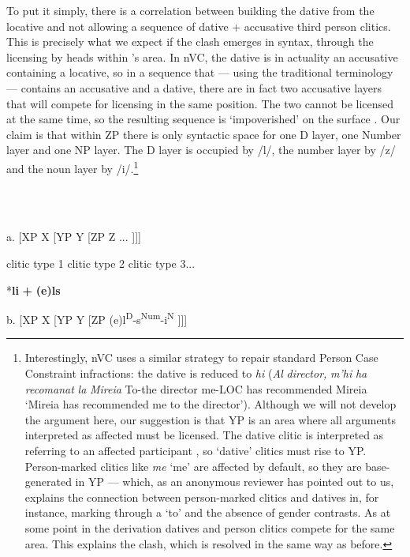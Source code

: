 \documentclass[output=paper,colorlinks,citecolor=brown]{./langscibook}
\begin{document}
To put it simply, there is a correlation between building the dative from the locative and not allowing a sequence of dative + accusative third person clitics. This is precisely what we expect if the clash emerges in syntax, through the licensing by heads within \citeauthor{Sportiche1996}’s area. In nVC, the dative is in actuality an accusative containing a locative, so in a sequence that — using the traditional terminology — contains an accusative and a dative, there are in fact two accusative layers that will compete for licensing in the same position. The two cannot be licensed at the same time, so the resulting sequence is ‘impoverished’ on the surface . Our claim is that within ZP there is only syntactic space for one D layer, one Number layer and one NP layer. The D layer is occupied by /l/, the number layer by /z/ and the noun layer by /i/.\footnote{Interestingly, nVC uses a similar strategy to repair standard Person Case Constraint infractions: the dative is reduced to \textit{hi} (\textit{Al} \textit{director,} \textit{m’hi} \textit{ha} \textit{recomanat} \textit{la} \textit{Mireia} To-the director me-LOC has recommended Mireia ‘Mireia has recommended me to the director’). Although we will not develop the argument here, our suggestion is that YP is an area where all arguments interpreted as affected must be licensed. The dative clitic is interpreted as referring to an affected participant \citep{AdgerHarbour2007}, so ‘dative’ clitics must rise to YP. Person-marked clitics like \textit{me} ‘me’ are affected by default, so they are base{}-generated in YP — which, as an anonymous reviewer has pointed out to us, explains the connection between person-marked clitics and datives in, for instance, marking through a ‘to’ and the absence of gender contrasts. As at some point in the derivation datives and person clitics compete for the same area. This explains the clash, which is resolved in the same way as before.}  

\ea%
    \label{ex:key:16}
    \gll\\
        \\
    \glt
    \z

           a. [XP  X  [YP    Y  [ZP  Z  ...  ]]]

     clitic type 1  clitic type 2    clitic type 3...

              *\textbf{li} \textbf{+} \textbf{(e)ls}

   b. [XP  X  [YP    Y  [ZP (e)l\textsuperscript{D}{}-s\textsuperscript{Num}{}-i\textsuperscript{N}     ]]]
\end{document}

